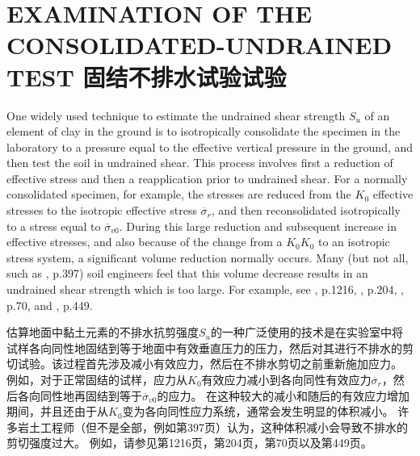 \section{EXAMINATION OF THE CONSOLIDATED-UNDRAINED TEST 固结不排水试验试验}

\begin{paracol}{2}
    
    One widely used technique to estimate the undrained shear strength $S_u$ of an element of clay in the ground is to isotropically consolidate the specimen in the laboratory to a pressure equal to the effective vertical pressure in the ground, and then test the soil in undrained shear. This process involves first a reduction of effective stress and then a reapplication prior to undrained shear. For a normally consolidated specimen, for example, the stresses are reduced from the $K_0$ effective stresses to the isotropic effective stress $\overline{\sigma}_r$, and then reconsolidated isotropically to a stress equal to $\overline{\sigma}_{v0}$. During this large reduction and subsequent increase in effective stresses, and also because of the change from a $K_0$$K_0$ to an isotropic stress system, a significant volume reduction normally occurs. Many (but not all, such as \citet{Taylor1948}, p.397) soil engineers feel that this volume decrease results in an undrained shear strength which is too large. For example, see \citet{Rutledge19441155}, p.1216, \citet{Hansen1948189}, p.204, \citet{Osterberg1956}, p.70, and \citet{Bishop1960437}, p.449.

    \switchcolumn

    估算地面中黏土元素的不排水抗剪强度$S_u$的一种广泛使用的技术是在实验室中将试样各向同性地固结到等于地面中有效垂直压力的压力，然后对其进行不排水的剪切试验。该过程首先涉及减小有效应力，然后在不排水剪切之前重新施加应力。 例如，对于正常固结的试样，应力从$K_0$有效应力减小到各向同性有效应力$\overline{\sigma}_r$，然后各向同性地再固结到等于$\overline{\sigma}_{v0}$的应力。 在这种较大的减小和随后的有效应力增加期间，并且还由于从$K_0$变为各向同性应力系统，通常会发生明显的体积减小。 许多岩土工程师（但不是全部，例如\citet{Taylor1948}第397页）认为，这种体积减小会导致不排水的剪切强度过大。 例如，请参见\citet{Rutledge19441155}第1216页，\citet{Hansen1948189}第204页，\citet{Osterberg1956}第70页以及\citet{Bishop1960437}第449页。

\end{paracol}


